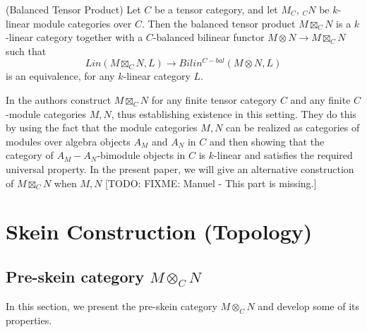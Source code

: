 
\begin{definition}\label{def_balanced} (Balanced Tensor Product)
  \noindent Let $C$ be a tensor category, and let $M_C$, $_{C}N$ be $k$-linear module categories over $C$.
  \quad Then the balanced tensor product $M \boxtimes_{C} N$ is a $k$-linear
  category together with a $C$-balanced bilinear functor
  $M\otimes N\to M\boxtimes_{C} N$ such
  that \[Lin(M \boxtimes_{C} N, L) \to Bilin^{C-bal}(M \otimes N, L)\] is an
  equivalence, for any $k$-linear category $L$.
\end{definition}

In \cite{douglas/balanced-product} the authors construct $M\boxtimes_C N$ for any finite tensor category $C$ and any finite $C$-module categories $M, N$, thus establishing existence in this setting. They do this by using the fact that the module categories $M,N$ can be realized as categories of modules over algebra objects $A_M$ and $A_N$ in $C$ and then showing that the category of $A_M-A_N$-bimodule objects in $C$ is $k$-linear and satisfies the required universal property. In the present paper, we will give an alternative construction of $M\boxtimes_C N$ when $M,N$ [TODO: FIXME: Manuel - This part is missing.]

\section{Skein Construction (Topology)}\label{section/skein-construction}

\subsection{Pre-skein category $M\otimes_C N$}

\noindent In this section, we present the pre-skein category $M \otimes_{C} N$
and develop some of its properties.

